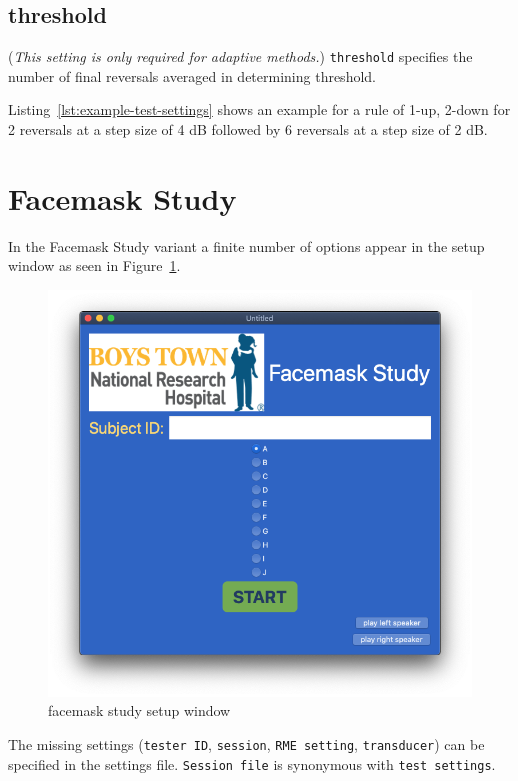\documentclass[11pt,pdftex,letterpaper]{article}
\begin{document}
\subsection{threshold}
(\textit{This setting is only required for adaptive methods.}) \texttt{threshold} specifies the number of final reversals averaged in determining threshold.

\vspace{\baselineskip}
Listing~\ref{lst:example-test-settings} shows an example for a rule of 1-up, 2-down for 2 reversals at a step size of 4 dB followed by 6 reversals at a step size of 2 dB.

\section{Facemask Study}
In the Facemask Study variant a finite number of options appear in the setup window as seen in Figure~\ref{fig:facemask-study}.
\begin{figure}
	\centering
	\includegraphics[width = 0.9\linewidth]{facemask-study.png}
	\caption{facemask study setup window}
	\label{fig:facemask-study}
\end{figure}
The missing settings (\texttt{tester ID}, \texttt{session}, \texttt{RME setting}, \texttt{transducer}) can be specified in the settings file. \texttt{Session file} is synonymous with \texttt{test settings}.
\end{document}
